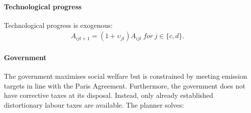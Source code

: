 \paragraph{Technological progress}
Technological progress is exogenous:
\begin{align}
A_{ijt+1}=(1+\upsilon_{jt}) A_{ijt}\ for \ j \in\{c,d\}. 
\end{align}

\begin{comment}
\paragraph{Impossibility of reaching target in laissez-faire with exogenous growth}
\tr{Note that this is wrong! There is an option for the gov to affect inflation which then redirects demand.}
Note that with exogenous growth in each sector there is no possibility for the government to stop emissions from growing, since production of the dirty good is essential for the consumption good (no perfect substitution: $\varepsilon<\infty$). To meet the emission target, the government either needs to affect the growth rate in the economy; i.e., $\upsilon_j$ is a choice variable, or work and consumption need to be set to zero; or the emission target has to be defined in relative terms. The latter possibility contradicts the Paris Agreement which is concerned with absolute emissions.  
I therefore assume, that the government can change the growth rate.

The government chooses the growth rate in each sector, taking into account that research is constrained by an exogenous  amount of scientists
\begin{align}
\upsilon_{ct}+\upsilon_{dt}\leq\Upsilon
\end{align}
\end{comment} 
  
\paragraph{Government}

The government maximises social welfare but is constrained by meeting emission targets in line with the Paris Agreement. Furthermore, the government does not have corrective taxes at its disposal. Instead, only already established distortionary labour taxes are available. The planner solves:

